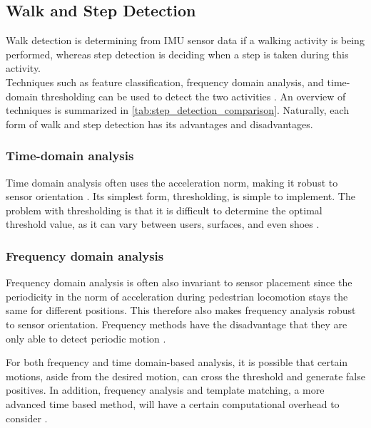 \subsection{Walk and Step Detection}
\label{sec:rw - step detection}
Walk detection is determining from \ac{IMU} sensor data if a walking activity is being performed, whereas step detection is deciding when a step is taken during this activity. \\
Techniques such as feature classification, frequency domain analysis, and time-domain thresholding can be used to detect the two activities \cite{Yang2014}. An overview of techniques  is summarized in \cref{tab:step_detection_comparison}. Naturally, each form of walk and step detection has its advantages and disadvantages.\par

\subsubsection{Time-domain analysis}
 Time domain analysis often uses the acceleration norm, making it robust to sensor orientation \cite{Davidson2017}. Its simplest form, thresholding, is simple to implement. The problem with thresholding is that it is difficult to determine the optimal threshold value, as it can vary between users, surfaces, and even shoes \cite{Brajdic2013}.  

\subsubsection{Frequency domain analysis} 
Frequency domain analysis is often  also invariant to sensor placement \cite{Brajdic2013} since the periodicity in the norm of acceleration during pedestrian locomotion stays the same for different positions. This therefore also makes frequency analysis robust to sensor orientation. Frequency methods have the disadvantage that they are only able to detect periodic motion \cite{Davidson2017}. \par 

For both frequency and time domain-based analysis, it is possible that certain motions, aside from the desired motion, can cross the threshold and generate false positives. In addition, frequency analysis and template matching, a more advanced time based method, will have a certain computational overhead to consider \cite{Davidson2017, Harle2013}. 

